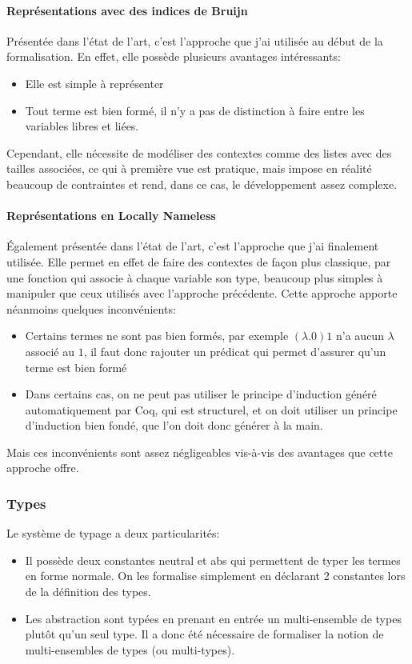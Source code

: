 \documentclass[10pt]{article}
\begin{document}
\paragraph{Représentations avec des indices de Bruijn} Présentée dans l'état de l'art, c'est l'approche que j'ai utilisée au début de la formalisation. En effet, elle possède plusieurs avantages intéressants:
\begin{itemize}
  \item Elle est simple à représenter
  \item Tout terme est bien formé, il n'y a pas de distinction à faire entre les variables libres et liées.
\end{itemize}
Cependant, elle nécessite de modéliser des contextes comme des listes avec des tailles associées, ce qui à première vue est pratique, mais impose en réalité beaucoup de contraintes et rend, dans ce cas, le développement assez complexe.

\paragraph{Représentations en Locally Nameless}
Également présentée dans l'état de l'art, c'est l'approche que j'ai finalement utilisée. Elle permet en effet de faire des contextes de façon plus classique, par une fonction qui associe à chaque variable son type, beaucoup plus simples à manipuler que ceux utilisés avec l'approche précédente. Cette approche apporte néanmoins quelques inconvénients:
\begin{itemize}
  \item Certains termes ne sont pas bien formés, par exemple $(\lambda . 0) 1$ n'a aucun $\lambda$ associé au $1$, il faut donc rajouter un prédicat qui permet d'assurer qu'un terme est bien formé
  \item Dans certains cas, on ne peut pas utiliser le principe d'induction généré automatiquement par Coq, qui est structurel, et on doit utiliser un principe d'induction bien fondé, que l'on doit donc générer à la main.
\end{itemize}
Mais ces inconvénients sont assez négligeables vis-à-vis des avantages que cette approche offre.

\subsubsection{Types}

Le système de typage a deux particularités:
\begin{itemize}
  \item Il possède deux constantes \textsf{neutral} et \textsf{abs} qui permettent de typer les termes en forme normale. On les formalise simplement en déclarant 2 constantes lors de la définition des types.
  \item Les abstraction sont typées en prenant en entrée un multi-ensemble de types plutôt qu'un seul type. Il a donc été nécessaire de formaliser la notion de multi-ensembles de types (ou multi-types).
\end{itemize}
\end{document}
